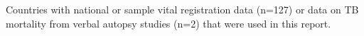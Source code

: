 Countries with national or sample vital registration data (n=127) or data on TB mortality from verbal autopsy studies (n=2) that were used in this report.